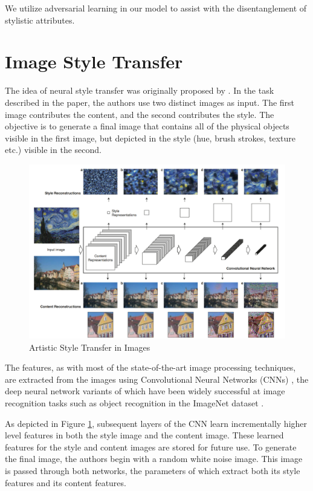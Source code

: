 We utilize adversarial learning in our model to assist with the disentanglement of stylistic attributes.


\section{Image Style Transfer}

The idea of neural style transfer was originally proposed by \cite{gatys2016image}. In the task described in the paper, the authors use two distinct images as input. The first image contributes the content, and the second contributes the style. The objective is to generate a final image that contains all of the physical objects visible in the first image, but depicted in the style (hue, brush strokes, texture etc.) visible in the second.

\begin{figure}[ht]
	\centering
	\includegraphics[width=\textwidth]{images/image-style-transfer}
	\caption{\label{fig:image-style-transfer} Artistic Style Transfer in Images}
\end{figure}

The features, as with most of the state-of-the-art image processing techniques, are extracted from the images using Convolutional Neural Networks (CNNs) \citep{lecun1998gradient}, the deep neural network variants of which have been widely successful at image recognition tasks such as object recognition in the ImageNet dataset \citep{krizhevsky2012imagenet}.

As depicted in Figure \ref{fig:image-style-transfer}, subsequent layers of the CNN learn incrementally higher level features in both the style image and the content image. These learned features for the style and content images are stored for future use. To generate the final image, the authors begin with a random white noise image. This image is passed through both networks, the parameters of which extract both its style features and its content features.

